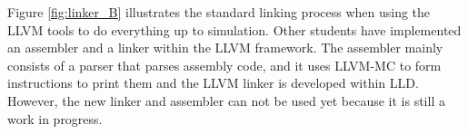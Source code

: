 Figure \ref{fig:linker_B} illustrates the standard linking process when using the LLVM tools to do everything up to simulation. Other students have implemented an assembler and a linker within the LLVM framework. The assembler mainly consists of a parser that parses assembly code, and it uses LLVM-MC to form instructions to print them and the LLVM linker is developed within LLD. However, the new linker and assembler can not be used yet because it is still a work in progress.









